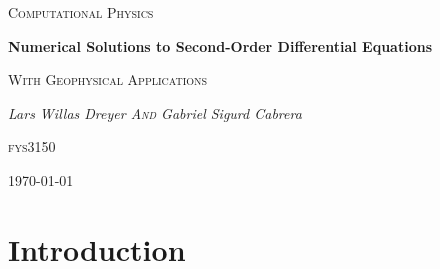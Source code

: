 \documentclass[a4paper,10pt,english]{article}
\begin{document}
\begin{titlepage}
	\centering
	{\scshape\LARGE Computational Physics \par}
	\vspace{1cm}
	{\huge\bfseries Numerical Solutions to Second-Order Differential Equations  \par}
	\vspace{1.5cm}
	{\scshape\Large With Geophysical Applications \par}
	\vspace{2cm}
	{\Large\itshape Lars Willas Dreyer \textsc{And} Gabriel Sigurd Cabrera\par}
	\vfill
	\textsc{fys}3150	\vfill

	{\large \today\par}
\end{titlepage}

\begin{abstract}
In this report, we analyzed the well-known 1-D \textit{diffusion equation} analytically, and proceed to develop a Forward Euler, Backward Euler, and Crank-Nicolson numerical solution using the analytical solution as a benchmark for accuracy. We found that the Crank-Nicolson and Backward Euler algorithms match the analytical solution best, while also maintaining a better stability. 

We then proceed to develop a 2-D model for the diffusion equation using the Forward-Euler algorithm; this was then applied to a real world scenario, where the diffused quantity was \textit{heat}.  Specifically, we modeled the evolution of the Fennoscandian lithosphere over the course of one billion years, with the assumption that it once was home to a subduction zone. With the model divided into the upper crust, lower crust, and mantle, each layer would produce heat at a different base rate, while the mantle would have an additional heat production from radioactive decay of Uranium, Thorium, and Potassium.  

Overall, our results made sense with respect to our expectations – namely, that the lithosphere would get hotter and hotter over time, and spread its heat over to the crust.  Whether or not this reflects reality is an unanswered question, as we would need more data to determine whether or not the current temperature of the mantle is as our model predicts.
\end{abstract}

\section*{Introduction}
\end{document}
